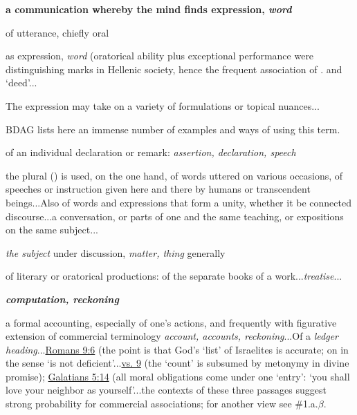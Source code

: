 				\begin{compactdesc}
					\item[BDAG 530b] \textbf{}
						\begin{compactitem}
							\item[1] \textbf{a communication whereby the mind finds expression, \textit{word}}
							\item[1.a] of utterance, chiefly oral
							\item[1.a.$\alpha$] as expression, \textit{word} (oratorical ability plus exceptional performance were distinguishing marks in Hellenic society, hence the frequent association of . and  `deed'...
							\item[1.a.$\beta$] The expression may take on a variety of formulations or topical nuances...
								\begin{compactitem}
									\item BDAG lists here an immense number of examples and ways of using this term.
								\end{compactitem}
							\item[1.a.$\gamma$] of an individual declaration or remark: \textit{assertion, declaration, speech}
							\item[1.a.$\delta$] the plural ()  is used, on the one hand, of words uttered on various occasions, of speeches or instruction given here and there by humans or transcendent beings...Also of words and expressions that form a unity, whether it be connected discourse...a conversation, or parts of one and the same teaching, or expositions on the same subject...
							\item[1.a.$\epsilon$] \textit{the subject} under discussion, \textit{matter, thing} generally
							\item[1.b] of literary or oratorical productions: of the separate books of a work...\textit{treatise}...
							\item[2] \textbf{\textit{computation, reckoning}}
							\item[2.a] a formal accounting, especially of one's actions, and frequently with figurative extension of commercial terminology \textit{account, accounts, reckoning}...Of a \textit{ledger heading}...\hyperref[ROMANS-9-6]{Romans 9:6} (the point is that God's `list' of Israelites is accurate; on  in the sense `is not deficient'...\hyperref[ROMANS-9-9]{vs. 9} (the `count' is subsumed by metonymy in divine promise); \hyperref[GALATIANS-5-14]{Galatians 5:14} (all moral obligations come under one `entry': `you shall love your neighbor as yourself'...the contexts of these three passages suggest strong probability for commercial associations; for another view see \#1.a.$\beta$.

\end{compactitem}
\end{compactdesc}
